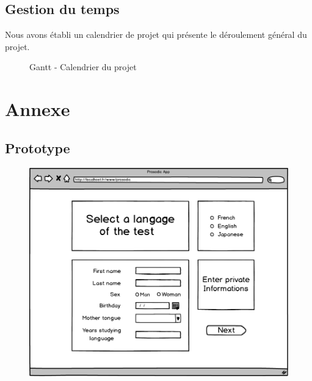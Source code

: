 \documentclass[a4paper,twoside,10pt]{report}
\begin{document}
  \section{Gestion du temps}
  
  Nous avons établi un calendrier de projet qui présente le déroulement général du projet.
  
  \begin{figure}[h]
    \begin{center}
     \caption{\label{gantt} Gantt - Calendrier du projet}
    \end{center}   
  \end{figure}


  
\chapter{Annexe}

  \section{Prototype}
  
 \begin{figure}[ht]
  \includegraphics[width=\textwidth]{0.png}
 \end{figure}
 
\end{document}
